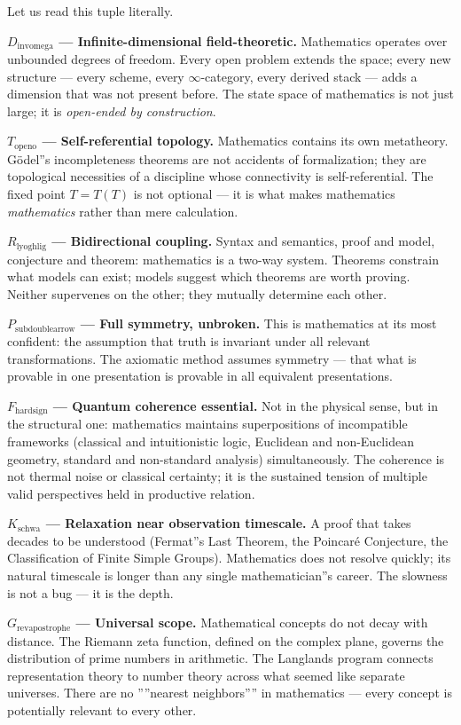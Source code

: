 \documentclass[12pt,a4paper]{article}
\begin{document}
Let us read this tuple literally.

\textbf{$D_{\text{invomega}}$ --- Infinite-dimensional field-theoretic.} Mathematics operates over unbounded degrees of freedom. Every open problem extends the space; every new structure --- every scheme, every $\infty$-category, every derived stack --- adds a dimension that was not present before. The state space of mathematics is not just large; it is \emph{open-ended by construction}.

\textbf{$T_{\text{openo}}$ --- Self-referential topology.} Mathematics contains its own metatheory. Gödel''s incompleteness theorems are not accidents of formalization; they are topological necessities of a discipline whose connectivity is self-referential. The fixed point $T = T(T)$ is not optional --- it is what makes mathematics \emph{mathematics} rather than mere calculation.

\textbf{$R_{\text{lyoghlig}}$ --- Bidirectional coupling.} Syntax and semantics, proof and model, conjecture and theorem: mathematics is a two-way system. Theorems constrain what models can exist; models suggest which theorems are worth proving. Neither supervenes on the other; they mutually determine each other.

\textbf{$P_{\text{subdoublearrow}}$ --- Full symmetry, unbroken.} This is mathematics at its most confident: the assumption that truth is invariant under all relevant transformations. The axiomatic method assumes symmetry --- that what is provable in one presentation is provable in all equivalent presentations.

\textbf{$F_{\text{hardsign}}$ --- Quantum coherence essential.} Not in the physical sense, but in the structural one: mathematics maintains superpositions of incompatible frameworks (classical and intuitionistic logic, Euclidean and non-Euclidean geometry, standard and non-standard analysis) simultaneously. The coherence is not thermal noise or classical certainty; it is the sustained tension of multiple valid perspectives held in productive relation.

\textbf{$K_{\text{schwa}}$ --- Relaxation near observation timescale.} A proof that takes decades to be understood (Fermat''s Last Theorem, the Poincaré Conjecture, the Classification of Finite Simple Groups). Mathematics does not resolve quickly; its natural timescale is longer than any single mathematician''s career. The slowness is not a bug --- it is the depth.

\textbf{$G_{\text{revapostrophe}}$ --- Universal scope.} Mathematical concepts do not decay with distance. The Riemann zeta function, defined on the complex plane, governs the distribution of prime numbers in arithmetic. The Langlands program connects representation theory to number theory across what seemed like separate universes. There are no ''''nearest neighbors'''' in mathematics --- every concept is potentially relevant to every other.
\end{document}
